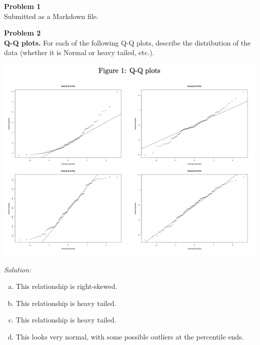 \documentclass{article}
\newenvironment{problem}[2][Problem]
    { \begin{mdframed}[backgroundcolor=gray!20] \textbf{#1 #2} \\}
    {  \end{mdframed}}
\newenvironment{solution}
    {\textit{Solution:}}
    {}
\begin{document}
\begin{problem}{1}
Submitted as a  Markdown file. 
\end{problem}

\begin{problem}{2}
\textbf{Q-Q plots.} For each of the following Q-Q plots, describe the distribution of the data (whether it is Normal or heavy tailed, etc.).


\begin{center}
  \includegraphics[width=6in]{fig1.png}
\end{center}
\end{problem}
\begin{solution}
\begin{enumerate}[(a)]
\item This relationship is right-skewed. 
\item This relationship is heavy tailed. 
\item This relationship is heavy tailed. 
\item This looks very normal, with some possible outliers at the percentile ends. 
\end{enumerate}
\end{solution}
\end{document}
